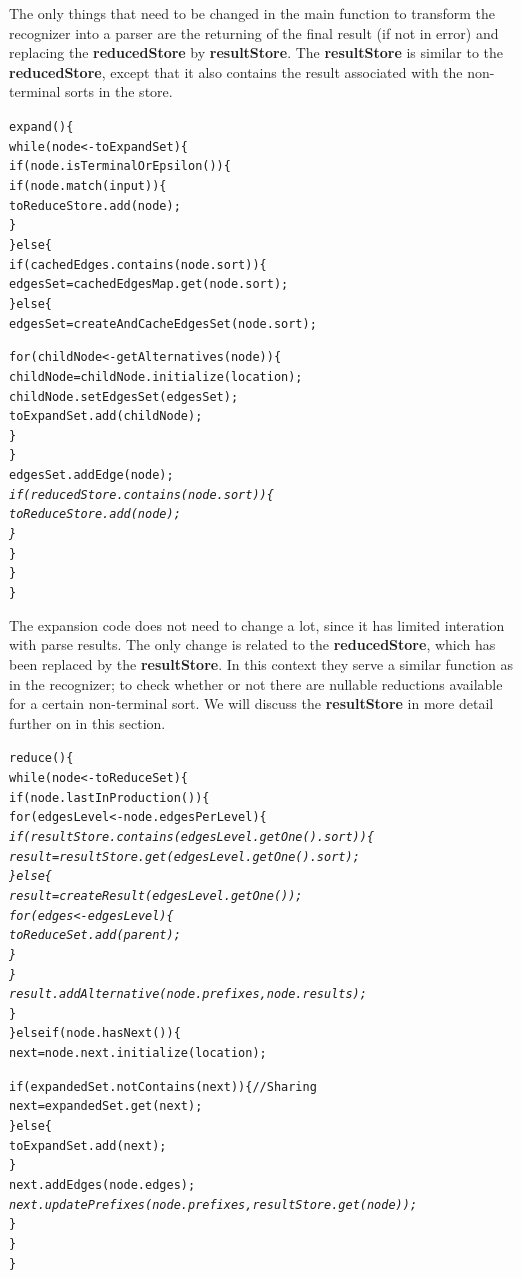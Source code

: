 \documentclass[a4paper,10pt]{article}
\begin{document}
The only things that need to be changed in the main function to transform the recognizer into a parser are the returning of the final result (if not in error) and replacing the {\bf reducedStore} by {\bf resultStore}. The {\bf resultStore} is similar to the {\bf reducedStore}, except that it also contains the result associated with the non-terminal sorts in the store.

\pagebreak
{\small
\begin{alltt}
expand()\{
  while(node <- toExpandSet)\{
    if(node.isTerminalOrEpsilon())\{
      if(node.match(input))\{
        toReduceStore.add(node);
      \}
    \}else\{
      if(cachedEdges.contains(node.sort))\{
        edgesSet = cachedEdgesMap.get(node.sort);
      \}else\{
        edgesSet = createAndCacheEdgesSet(node.sort);
        
        for(childNode <- getAlternatives(node))\{
          childNode = childNode.initialize(location);
          childNode.setEdgesSet(edgesSet);
          toExpandSet.add(childNode);
        \}
      \}
      edgesSet.addEdge(node);
      \textit{
      if(reducedStore.contains(node.sort))\{
        toReduceStore.add(node);
      \}}
    \}
  \}
\}
\end{alltt}
}

The expansion code does not need to change a lot, since it has limited interation with parse results. The only change is related to the {\bf reducedStore}, which has been replaced by the {\bf resultStore}. In this context they serve a similar function as in the recognizer; to check whether or not there are nullable reductions available for a certain non-terminal sort. We will discuss the {\bf resultStore} in more detail further on in this section.

\pagebreak
{\small
\begin{alltt}
reduce()\{
  while(node <- toReduceSet)\{
    if(node.lastInProduction())\{
      for(edgesLevel <- node.edgesPerLevel)\{\textit{
        if(resultStore.contains(edgesLevel.getOne().sort))\{
          result = resultStore.get(edgesLevel.getOne().sort);
        \}else\{
          result = createResult(edgesLevel.getOne());
          for(edges <- edgesLevel)\{
            toReduceSet.add(parent);
          \}
        \}
        result.addAlternative(node.prefixes, node.results);}
      \}
    \}else if(node.hasNext())\{
      next = node.next.initialize(location);
      
      if(expandedSet.notContains(next))\{ // Sharing
        next = expandedSet.get(next);
      \}else\{
        toExpandSet.add(next);
      \}
      next.addEdges(node.edges);\textit{
      next.updatePrefixes(node.prefixes, resultStore.get(node));}
    \}
  \}
\}
\end{alltt}
}
\end{document}
